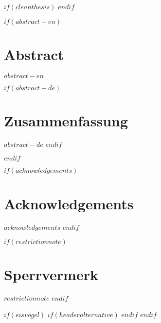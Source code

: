 
$if(cleanthesis)$
\clearpage
\customtitlebackpage
$endif$



$if(abstract-en)$
\cleardoublepage
\begin{minipage}{\linewidth}

\chapter*{Abstract}
$abstract-en$

$if(abstract-de)$
\chapter*{Zusammenfassung}
$abstract-de$
$endif$

\end{minipage}
\cleardoublepage
$endif$



$if(acknowledgements)$
\chapter*{Acknowledgements}
$acknowledgements$
$endif$



$if(restrictionnote)$
\chapter*{Sperrvermerk}
$restrictionnote$
$endif$



\cleardoublepage



$if(eisvogel)$
$if(headeralternative)$
    \pagestyle{headeralternative}
$endif$
$endif$
